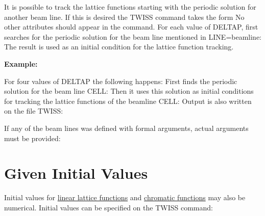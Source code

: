 It is possible to track the lattice functions starting with the periodic
solution for another beam line. If this is desired the TWISS command
takes the form  
No other attributes should appear in the command. For each value of
DELTAP, \madx first searches for the periodic solution for the beam line
mentioned in LINE=beamline: The result is used as an initial condition
for the lattice function tracking. 

{\bf Example:} 

For four values of DELTAP the following happens: First \madx finds the
periodic solution for the beam line CELL: Then it uses this solution as
initial conditions for tracking the lattice functions of the beamline
CELL: Output is also written on the file TWISS:  

If any of the beam lines was defined with formal arguments, actual
arguments must be provided:  

\section{Given Initial Values}

Initial values for \href{../Introduction/tables.html#linear}{linear
  lattice functions} and
\href{../Introduction/tables.html#chrom}{chromatic functions} may also
be numerical. Initial values can be specified on the TWISS command:  

